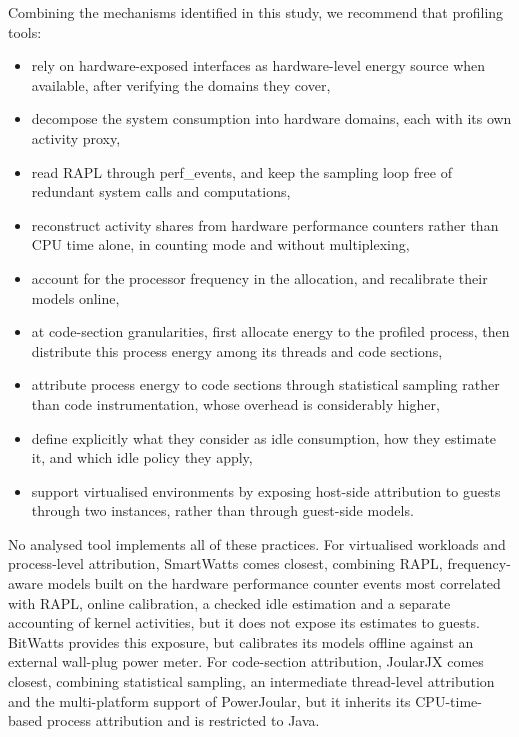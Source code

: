 \documentclass[
  acmsmall,
  screen,
  review,
  xcolor={dvipsnames,usenames}
]{acmart}
\begin{document}
Combining the mechanisms identified in this study, we recommend that profiling tools:
\begin{itemize}
    \item rely on hardware-exposed interfaces as hardware-level energy source when available, after verifying the domains they cover,
    \item decompose the system consumption into hardware domains, each with its own activity proxy,
    \item read RAPL through perf\_events, and keep the sampling loop free of redundant system calls and computations,
    \item reconstruct activity shares from hardware performance counters rather than CPU time alone, in counting mode and without multiplexing,
    \item account for the processor frequency in the allocation, and recalibrate their models online,
    \item at code-section granularities, first allocate energy to the profiled process, then distribute this process energy among its threads and code sections,
    \item attribute process energy to code sections through statistical sampling rather than code instrumentation, whose overhead is considerably higher,
    \item define explicitly what they consider as idle consumption, how they estimate it, and which idle policy they apply,
    \item support virtualised environments by exposing host-side attribution to guests through two instances, rather than through guest-side models.
\end{itemize}

No analysed tool implements all of these practices. For virtualised workloads and process-level attribution, SmartWatts \cite{fieniSmartWattsSelfCalibratingSoftwareDefined2020} comes closest, combining RAPL, frequency-aware models built on the hardware performance counter events most correlated with RAPL, online calibration, a checked idle estimation and a separate accounting of kernel activities, but it does not expose its estimates to guests. BitWatts \cite{colmantProcesslevelPowerEstimation2015} provides this exposure, but calibrates its models offline against an external wall-plug power meter. For code-section attribution, JoularJX \cite{noureddinePowerJoularJoularJXMultiPlatform2022} comes closest, combining statistical sampling, an intermediate thread-level attribution and the multi-platform support of PowerJoular, but it inherits its CPU-time-based process attribution and is restricted to Java.
\end{document}
